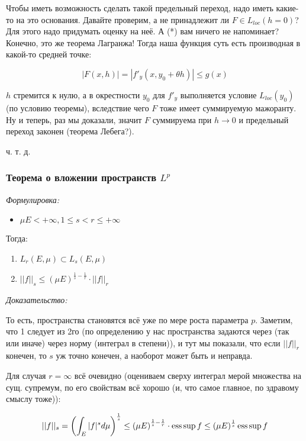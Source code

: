 \documentclass{article}
\begin{document}
Чтобы иметь возможность сделать такой предельный переход, надо иметь какие-то на это основания. Давайте проверим, а не принадлежит ли $F \in L_{loc}(h = 0)$? Для этого надо придумать оценку на неё. А (*) вам ничего не напоминает? Конечно, это же теорема Лагранжа! Тогда наша функция суть есть производная в какой-то средней точке:

\[|F(x, h)| = |f'_y(x, y_0 + \theta h)| \le g(x)\]

$h$ стремится к нулю, а в окрестности $y_0$ для $f'_y$ выполняется условие $L_{loc}(y_0)$ (по условию теоремы), вследствие чего $F$ тоже имеет суммируемую мажоранту. Ну и теперь, раз мы доказали, значит $F$ суммируема при $h \rightarrow 0$ и предельный переход законен (теорема Лебега?).

ч. т. д.

\subsubsection{Теорема о вложении пространств $L^p$}
\textit{Формулировка:}

\begin{itemize}
    \item $\mu E < + \infty, 1 \le s < r \le +\infty$
\end{itemize}

Тогда:

\begin{enumerate}
    \item $L_r(E, \mu) \subset L_s(E, \mu)$
    \item $||f||_s \le \left(\mu E\right)^{\frac{1}{s} - \frac{1}{r}} \cdot ||f||_{r}$
\end{enumerate}

\textit{Доказательство:}

То есть, пространства становятся всё уже по мере роста параметра $p$. Заметим, что 1 следует из 2го (по определению у нас пространства задаются через (так или иначе) через норму (интеграл в степени)), и тут мы показали, что если $||f||_r$ конечен, то $s$ уж точно конечен, а наоборот может быть и неправда.

Для случая $r = \infty$ всё очевидно (оцениваем сверху интеграл мерой множества на сущ. супремум, по его свойствам всё хорошо (и, что самое главное, по здравому смыслу тоже)):

\[||f||_s = \left(\int_{E} |f|^s d\mu\right)^{\frac{1}{s}} \le \left(\mu E\right)^{\frac{1}{s} - \frac{1}{r}} \cdot \operatorname*{ess\,sup} f \le (\mu E)^{\frac{1}{s}} \operatorname*{ess\,sup} f\]
\end{document}
